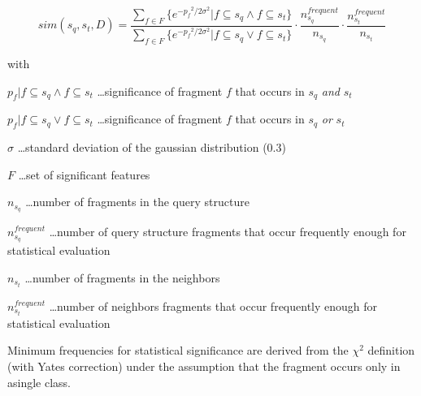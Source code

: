 \documentclass[10pt, a4paper]{article}
\begin{document}
\pagestyle{empty}
\setlength\parindent{0in}

\begin{equation} 
sim(s_q,s_t,D) = 
    \frac{\displaystyle \sum_{f \in F} \{e^{-{p_f}^2/2 \sigma^2} | f \subseteq s_q \wedge f \subseteq s_t\}} 
    {\displaystyle \sum_{f \in F} \{e^{-{p_f}^2/2 \sigma^2} | f \subseteq s_q \vee f \subseteq s_t\}}
		\cdot \frac{n^{frequent}_{s_q}}{n_{s_q}}
		\cdot \frac{n^{frequent}_{s_t}}{n_{s_t}}
\end{equation} 
 
with 
 
$ p_f | f \subseteq s_q \wedge f \subseteq s_t$ \ldots significance of fragment $f$ that occurs in $s_q$ \emph{and} $s_t$ 
 
$ p_f | f \subseteq s_q \vee f \subseteq s_t$ \ldots significance of fragment  $f$ that occurs in $s_q$ \emph{or} $s_t$

$\sigma$ \ldots standard deviation of the gaussian distribution ($0.3$)

$F$ \ldots set of significant features

$n_{s_q}$ \ldots number of fragments in the query structure

$n^{frequent}_{s_q}$ \ldots number of query structure fragments that occur frequently enough for statistical evaluation

$n_{s_t}$ \ldots number of fragments in the neighbors

$n^{frequent}_{s_t}$ \ldots number of neighbors fragments that occur frequently enough for statistical evaluation

Minimum frequencies for statistical significance are derived from the $\chi^2$ definition (with Yates correction) under the assumption that the fragment occurs only in asingle class.
\end{document}
